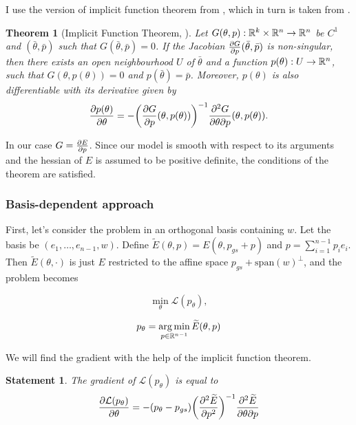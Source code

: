 \documentclass[a4paper,10pt]{report}
\newtheorem{theorem}{Theorem}
\newtheorem{statement}{Statement}
\begin{document}
I use the version of implicit function theorem from \cite{zucchet2022beyond}, which in turn is taken from \cite{dontchev2009implicit}.
\begin{theorem}[Implicit Function Theorem, \cite{zucchet2022beyond} ]
Let $G(\theta, p): \mathbb{R}^k \times \mathbb{R}^n \to \mathbb{R}^n$ be $C^1$ and $(\bar{\theta}, \bar{p})$ such that $G(\bar{\theta},\bar{p})=0$. If the Jacobian
$\frac{\partial G}{\partial p}(\bar{\theta},\bar{p})$ is non-singular, then there exists an open neighbourhood $U$ of $\bar{\theta} $ and a function $p(\theta):U \to \mathbb{R}^n$, such that $G(\theta, p(\theta)) = 0$ and $p(\bar{\theta}) = \bar{p}$. Moreover, $p(\theta)$ is also differentiable with
its derivative given by
\begin{equation}
\frac{\partial p(\theta)}{\partial \theta}= - \bigg(\frac{\partial G}{\partial p}(\theta, p(\theta))\bigg)^{-1} \frac{\partial^2 G}{\partial \theta \partial p}(\theta, p(\theta)).
\end{equation}

\end{theorem}
In our case $G = \frac{\partial E}{\partial p}$. Since our model is smooth with respect to its arguments and the hessian of $E$ is assumed to be positive definite, the conditions of the theorem are satisfied.


\subsubsection{Basis-dependent approach}

First, let's consider the problem in an orthogonal basis containing $w$. Let the basis be $(e_1,\ldots, e_{n-1}, w)$. Define $\widetilde{E}(\theta, p) = E(\theta, p_{gs}+ p)$ and $p = \sum_{i=1}^{n-1} p_i e_i$. Then $\widetilde E(\theta, \cdot)$ is just $E$ restricted to the affine space $p_{gs}+\text{span}(w)^\perp$, and the problem becomes

\begin{equation}
  \min_\theta \mathcal{L}(p_\theta),
\end{equation}

\begin{equation}
 p_\theta = \operatorname*{arg\,min}_{p\in \mathbb{R}^{n-1}} \widetilde{E}(\theta, p)
\end{equation}

We will find the gradient with the help of the implicit function theorem.

\begin{statement}
The gradient of $\mathcal{L}(p_\theta)$ is equal to
 \begin{equation}
 \frac{\partial \mathcal{L}(p_\theta)}{\partial \theta} = -(p_\theta - p_{gs}) \bigg(\frac{\partial^2  \widetilde{E}}{\partial p^2}\bigg)^{-1}  \frac{\partial^2  \widetilde{E}}{\partial \theta \partial p}
\end{equation}
\end{statement}
\end{document}
